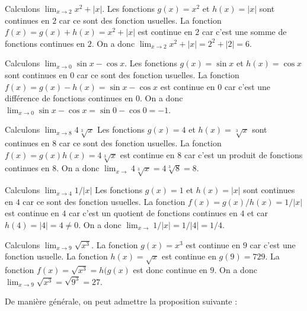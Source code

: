 \documentclass[main.tex]{subfiles}
\begin{document}
\begin{example}
    Calculons $\lim_{x \to 2} x^2 + |x|.$ Les fonctions $g(x) = x^2$ et $h(x) = |x|$ sont continues en $2$ car ce sont des fonction usuelles.
    La fonction $f(x) = g(x) + h(x) = x^2 + |x|$ est continue en $2$ car c'est une somme de fonctions continues en $2$.
    On a donc $\lim_{x \to 2} x^2 + |x| = 2^2 + |2| = 6$.
\end{example}

\begin{example}
    Calculons $\lim_{x \to 0} \sin x - \cos x.$ Les fonctions $g(x) = \sin x$ et $h(x) = \cos x$ sont continues en $0$ car ce sont des fonction usuelles.
    La fonction $f(x) = g(x) - h(x) = \sin x - \cos x$ est continue en $0$ car c'est une différence de fonctions continues en $0$.
    On a donc $\lim_{x \to 0} \sin x - \cos x = \sin 0 - \cos 0 = -1$.
\end{example}

\begin{example}
    Calculons $\lim_{x \to 8} 4 \sqrt[3]{x}$ Les fonctions $g(x) = 4$ et $h(x) = \sqrt[3]{x}$ sont continues en $8$ car ce sont des fonction usuelles.
    La fonction $f(x) = g(x)h(x) = 4 \sqrt[3]{x}$ est continue en $8$ car c'est un produit de fonctions continues en $8$.
    On a donc $\lim_{x \to } 4 \sqrt[3]{x} = 4 \sqrt[3]{8} = 8$.
\end{example}

\begin{example}
    Calculons $\lim_{x \to 4} 1/|x|$ Les fonctions $g(x) = 1$ et $h(x) = |x|$ sont continues en $4$ car ce sont des fonction usuelles.
    La fonction $f(x) = g(x)/h(x) = 1/|x|$ est continue en $4$ car c'est un quotient de fonctions continues en $4$
    et car $h(4) = |4| = 4 \ne 0$.
    On a donc $\lim_{x \to } 1/|x| = 1/|4| = 1/4$.
\end{example}

\begin{example}
    Calculons $\lim_{x \to 9} \sqrt{x^3}$. La fonction $g(x) = x^3$ est continue en $9$ car c'est une fonction usuelle.
    La fonction $h(x) = \sqrt{x}$ est continue en $g(9) = 729$.
    La fonction $f(x) = \sqrt{x^3} = h(g(x)$ est donc continue en $9$.
    On a donc $\lim_{x \to 9} \sqrt{x^3} = \sqrt{9^3} = 27$.
\end{example}

De manière générale, on peut admettre la proposition suivante :
\end{document}
